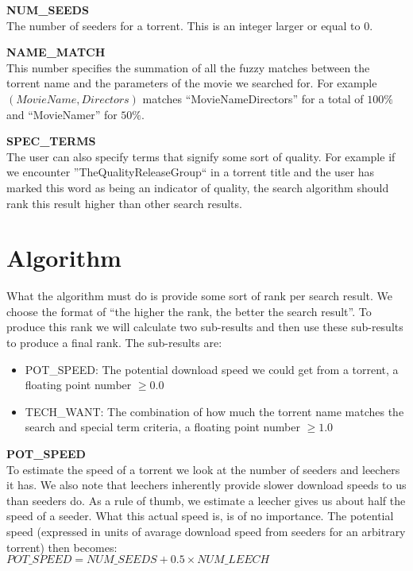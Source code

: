 \documentclass[a4paper,11pt]{article}
\begin{document}
\textbf{NUM\_SEEDS}\\
The number of seeders for a torrent.
This is an integer larger or equal to 0.

\textbf{NAME\_MATCH}\\
This number specifies the summation of all the fuzzy matches between the torrent name and the parameters
of the movie we searched for. For example $(MovieName, Directors)$ matches ``MovieNameDirectors'' for a total
of $100\%$ and ``MovieNamer'' for $50\%$.

\textbf{SPEC\_TERMS}\\
The user can also specify terms that signify some sort of quality. 
For example if we encounter ''TheQualityReleaseGroup`` in a torrent title and the user has marked
this word as being an indicator of quality, the search algorithm should rank this result higher than
other search results.

\section{Algorithm}
What the algorithm must do is provide some sort of rank per search result.
We choose the format of ``the higher the rank, the better the search result''.
To produce this rank we will calculate two sub-results and then use these sub-results to produce a final rank.
The sub-results are:
\begin{itemize}
\item POT\_SPEED: The potential download speed we could get from a torrent, a floating point number $\ge0.0$
\item TECH\_WANT: The combination of how much the torrent name matches the search and special term
criteria, a floating point number $\ge1.0$
\end{itemize}

\textbf{POT\_SPEED}\\
To estimate the speed of a torrent we look at the number of seeders and leechers it has.
We also note that leechers inherently provide slower download speeds to us than seeders do.
As a rule of thumb, we estimate a leecher gives us about half the speed of a seeder.
What this actual speed is, is of no importance.
The potential speed (expressed in units of avarage download speed from seeders for an arbitrary torrent)
then becomes:\\
$POT\_SPEED = NUM\_SEEDS + 0.5 \times NUM\_LEECH$
\end{document}
